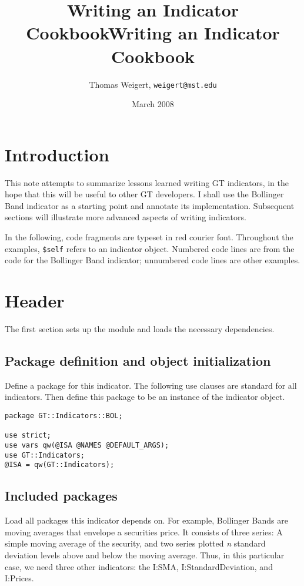 \documentclass[11pt,twoside]{article}
\author{Thomas Weigert, {\tt weigert@mst.edu}}
\title{Writing an Indicator Cookbook}
\date{March 2008}
\title{Writing an Indicator Cookbook}
\begin{document}
\maketitle

\section{Introduction}
This note attempts to summarize lessons learned writing GT indicators,
in the hope that this will be useful to other GT developers. I shall
use the Bollinger Band indicator as a starting point and annotate its
implementation. Subsequent sections will illustrate more advanced
aspects of writing indicators.

In the following, code fragments are typeset in red courier font.
Throughout the examples, \lstinline!$self! refers to an
indicator object. Numbered code lines are from the code for the
Bollinger Band indicator; unnumbered code lines are other examples.

\section{Header}
The first section sets up the module and loads the necessary
dependencies.

\subsection{Package definition and object initialization}
Define a package for this indicator. The following use clauses are
standard for all indicators. Then define this package to be an instance
of the indicator object.

\begin{lstlisting}[name=example]
package GT::Indicators::BOL;

use strict;
use vars qw(@ISA @NAMES @DEFAULT_ARGS);
use GT::Indicators;
@ISA = qw(GT::Indicators);
\end{lstlisting}

\subsection{Included packages}
Load all packages this indicator depends on. For example, Bollinger
Bands are moving averages that envelope a securities price. It consists
of three series: A simple moving average of the security, and two
series plotted \textit{n} standard deviation levels above and below the
moving average. Thus, in this particular case, we need three other
indicators: the I:SMA, I:StandardDeviation, and I:Prices.
\end{document}
